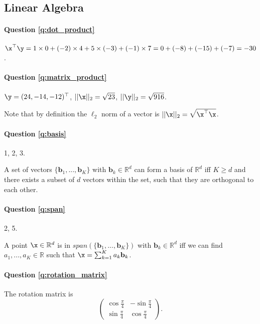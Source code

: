 \subsection{Linear Algebra}

\paragraph{Question \ref{q:dot_product}}
$\x^\top \y = 1 \times 0 + (-2) \times 4 + 5 \times (-3) + (-1) \times 7 = 0 + (-8) + (-15) + (-7) = -30$.

\paragraph{Question \ref{q:matrix_product}}
$\y = (24, -14, -12)^\top$, $|| \x ||_2 = \sqrt{23}$, $|| \y ||_2 = \sqrt{916}$.

Note that by definition the $\ell_2$ norm of a vector is $|| \x ||_2 = \sqrt{\x^\top \x}$.

\paragraph{Question \ref{q:basis}} 1, 2, 3. 

A set of vectors $\{\mathbf{b}_1, ..., \mathbf{b}_K \}$ with $\mathbf{b}_k \in \mathbb{R}^d$ can form a basis of $\mathbb{R}^d$ iff $K \geq d$ and there exists a subset of $d$ vectors within the set, such that they are orthogonal to each other.

\paragraph{Question \ref{q:span}} 2, 5. 

A point $\x \in \mathbb{R}^d$ is in $span(\{\mathbf{b}_1, ..., \mathbf{b}_K \})$ with $\mathbf{b}_k \in \mathbb{R}^d$ iff we can find $a_1, ..., a_K \in \mathbb{R}$ such that $\x = \sum_{k=1}^K a_k \mathbf{b}_k$.

\paragraph{Question \ref{q:rotation_matrix}} The rotation matrix is 
\begin{equation*}
    \begin{pmatrix}
    \cos{\frac{\pi}{4}} & -\sin{\frac{\pi}{4}} \\
    \sin{\frac{\pi}{4}} & \cos{\frac{\pi}{4}}
    \end{pmatrix}.
\end{equation*}

